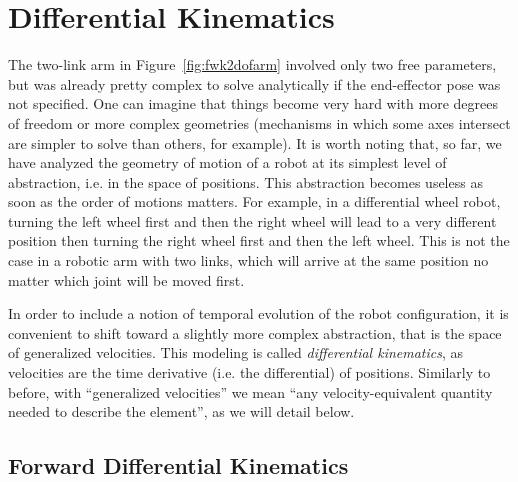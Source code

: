 \section{Differential Kinematics}\label{sec:kinematics:diff}

The two-link arm in Figure~\ref{fig:fwk2dofarm} involved only two free parameters, but was already pretty complex to solve analytically if the end-effector pose was not specified.
One can imagine that things become very hard with more degrees of freedom or more complex geometries (mechanisms in which some axes intersect are simpler to solve than others, for example).
It is worth noting that, so far, we have analyzed the geometry of motion of a robot at its simplest level of abstraction, i.e. in the space of positions. This abstraction becomes useless as soon as the order of motions matters. For example, in a differential wheel robot, turning the left wheel first and then the right wheel will lead to a very different position then turning the right wheel first and then the left wheel. This is not the case in a robotic arm with two links, which will arrive at the same position no matter which joint will be moved first. 

In order to include a notion of temporal evolution of the robot configuration, it is convenient to shift toward a slightly more complex abstraction, that is the space of generalized velocities. This modeling is called \textsl{differential kinematics}, as velocities are the time derivative (i.e. the differential) of positions.
Similarly to before, with ``generalized velocities'' we mean ``any velocity-equivalent quantity needed to describe the element'', as we will detail below.

\subsection{Forward Differential Kinematics}\label{sec:kinematics:diff:fwd}

